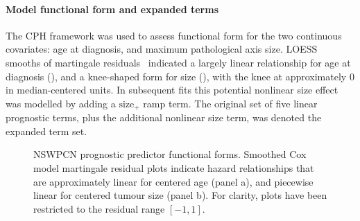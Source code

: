 \documentclass[dissertation.tex]{subfiles}
\begin{document}
\paragraph{Model functional form and expanded terms}
The \gls{CPH} framework was used to assess functional form for the two continuous covariates: age at diagnosis, and maximum pathological axis size.  \Gls{LOESS} smooths of martingale residuals~\cite{Therneau1990} indicated a largely linear relationship for age at diagnosis (), and a knee-shaped form for size (), with the knee at approximately $0$ in median-centered units.  In subsequent fits this potential nonlinear size effect was modelled by adding a $\mathrm{size}_+$ ramp term.  The original set of five linear prognostic terms, plus the additional nonlinear size term, was denoted the expanded term set.

\begin{figure}[!htbp]
\centering
\caption[Prognostic predictor functional forms]{\gls{NSWPCN} prognostic predictor functional forms. Smoothed Cox model martingale residual plots indicate hazard relationships that are approximately linear for centered age (panel a), and piecewise linear for centered tumour size (panel b).  For clarity, plots have been restricted to the residual range $[-1,1]$.}
\label{fig:nomo-funcform}
\end{figure}
\end{document}
